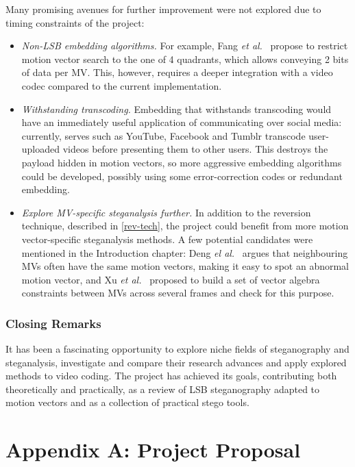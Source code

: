 \documentclass[12pt,british,twoside,notitlepage,usenames,dvipsnames,hypens,final]{report}
\numberwithin{equation}{section}
\numberwithin{figure}{section}
\begin{document}
Many promising avenues for further improvement were not explored due to timing constraints of the project:
\begin{itemize}
\item \textit{Non-LSB embedding algorithms.} For example, Fang \emph{et al.}~\cite{fang2006data} propose to restrict motion vector search to the one of 4 quadrants, which allows conveying 2 bits of data per MV. This, however, requires a deeper integration with a video codec compared to the current implementation.
\item \textit{Withstanding transcoding.} Embedding that withstands transcoding would have an immediately useful application of communicating over social media: currently, serves such as YouTube, Facebook and Tumblr transcode user-uploaded videos before presenting them to other users. This destroys the payload hidden in motion vectors, so more aggressive embedding algorithms could be developed, possibly using some error-correction codes or redundant embedding.
\item \textit{Explore MV-specific steganalysis further.} In addition to the reversion technique, described in \ref{rev-tech}, the project could benefit from more motion vector-specific steganalysis methods. A few potential candidates were mentioned in the Introduction chapter: Deng \emph{el al.}~\cite{deng2012digital} argues that neighbouring MVs often have the same motion vectors, making it easy to spot an abnormal motion vector, and Xu \emph{et al.}~\cite{xu2013video} proposed to build a set of vector algebra constraints between MVs across several frames and check for this purpose.
\end{itemize}

\subsection*{Closing Remarks}

It has been a fascinating opportunity to explore niche fields of steganography and steganalysis, investigate and compare their research advances and apply explored methods to video coding. The project has achieved its goals, contributing both theoretically and practically, as a review of LSB steganography adapted to motion vectors and as a collection of practical stego tools.

\cleardoublepage



\appendix
\cleardoublepage
{}
\chapter*{Appendix A: Project Proposal}


\end{document}

